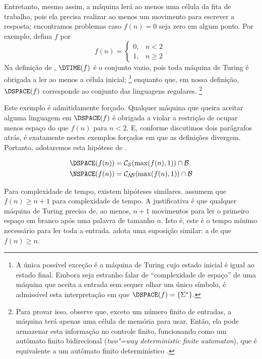 Entretanto,
mesmo assim,
a máquina lerá ao menos uma célula da fita de trabalho,
pois ela precisa realizar ao menos um movimento para escrever a resposta;
encontramos problemas caso $f(n) = 0$ seja zero em algum ponto.
Por exemplo, defina $f$ por
\begin{equation*}
    f(n) = \begin{cases}
        0, & n < 2 \\
        1, & n \geq 2
    \end{cases}.
\end{equation*}
Na definição de ,
$\DTIME(f)$ é o conjunto vazio,
pois toda máquina de Turing
é obrigada a ler ao menos a célula inicial;%
\footnote{
    A única possível exceção
    é a máquina de Turing
    cujo estado inicial é igual ao estado final.
    Embora seja estranho falar de ``complexidade de espaço''
    de uma máquina que aceita a entrada sem sequer olhar um único símbolo,
    é admissível esta interpretação em que
    $\DSPACE(f) = \{\Sigma^*\}$.
}
enquanto que, em nossa definição,
$\DSPACE(f)$ corresponde ao conjunto das linguagens regulares.%
\footnote{
    Para provar isso, observe que,
    exceto um número finito de entradas,
    a máquina terá apenas uma célula de memória para usar.
    Então, ela pode armazenar esta informação no controle finito,
    funcionando como um autômato finito bidirecional
    (\emph{two"=way deterministic finite automaton}),
    que é equivalente a um autômato finito determinístico
    \cite[p.~40]{HopcroftUllman1979}.
}

Este exemplo é admitidamente forçado.
Qualquer máquina que queira aceitar alguma linguagem em $\DSPACE(f)$
é obrigada a violar a restrição de
ocupar menos espaço do que $f(n)$
para $n < 2$.
E, conforme discutimos dois parágrafos atrás,
é exatamente nestes exemplos forçados
em que as definições divergem.
Portanto, adotaremos esta hipótese de
.

\begin{definition}
    \begin{align*}
        \DSPACE(f(n)) &= \mathcal C_\PhiDS(\max(f(n), 1)) \cap \mathcal B \\
        \NSPACE(f(n)) &= \mathcal C_\PhiNS(\max(f(n), 1)) \cap \mathcal B
    \end{align*}
\end{definition}

Para complexidade de tempo,
existem hipóteses similares.
assumem que $f(n) \geq n+1$
para complexidade de tempo.
A justificativa é que
qualquer máquina de Turing precisa de,
ao menos,
$n+1$ movimentos para ler o primeiro espaço em branco
após uma palavra de tamanho $n$.
Isto é,
este é o tempo mínimo necessário
para ler toda a entrada.
adota uma suposição similar:
a de que $f(n) \geq n$.

